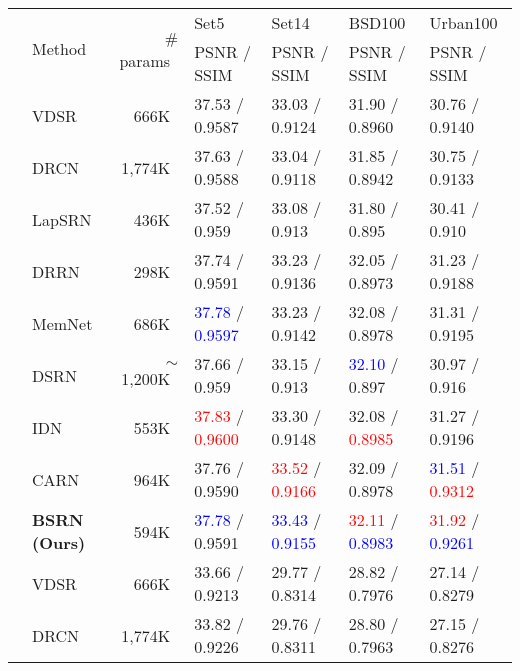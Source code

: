 \documentclass[runningheads]{llncs}
\begin{document}
\begin{table*}[t!]
	\scriptsize
	\begin{center}
		\begin{tabular}{c l r l l l l}
			\noalign{\smallskip}
			\hline
			\noalign{\smallskip}
			\multirow{2}{*}{~Scale~} & \multirow{2}{*}{Method} & \multirow{2}{*}{\# params~} & Set5 & Set14 & BSD100 & Urban100 \\
			& & & PSNR / SSIM~ & PSNR / SSIM~ & PSNR / SSIM~ & PSNR / SSIM~ \\
			\noalign{\smallskip}
			\hline
			\noalign{\smallskip}
			\multirow{9}{*}{$\times$2} & VDSR \cite{kim2016accurate} & 666K~ & 37.53 / 0.9587 & 33.03 / 0.9124 & 31.90 / 0.8960 & 30.76 / 0.9140 \\
			& DRCN \cite{kim2016deeply} & 1,774K~ & 37.63 / 0.9588 & 33.04 / 0.9118 & 31.85 / 0.8942 & 30.75 / 0.9133 \\
			& LapSRN \cite{lai2017deep} & 436K~ & 37.52 / 0.959~~ & 33.08 / 0.913~~ & 31.80 / 0.895~~ & 30.41 / 0.910~~ \\
			& DRRN \cite{tai2017image} & 298K~ & 37.74 / 0.9591 & 33.23 / 0.9136 & 32.05 / 0.8973 & 31.23 / 0.9188 \\
			& MemNet \cite{tai2017memnet} & 686K~ & \textcolor{blue}{37.78} / \textcolor{blue}{0.9597} & 33.23 / 0.9142 & 32.08 / 0.8978 & 31.31 / 0.9195 \\
			& DSRN \cite{han2018image} & $\sim$1,200K~ & 37.66 / 0.959~~ & 33.15 / 0.913~~ & \textcolor{blue}{32.10} / 0.897~~ & 30.97 / 0.916~~ \\
			& IDN \cite{hui2018fast} & 553K~ & \textcolor{red}{37.83} / \textcolor{red}{0.9600} & 33.30 / 0.9148 & 32.08 / \textcolor{red}{0.8985} & 31.27 / 0.9196 \\
			& CARN \cite{ahn2018fast} & 964K~ & 37.76 / 0.9590 & \textcolor{red}{33.52} / \textcolor{red}{0.9166} & 32.09 / 0.8978 & \textcolor{blue}{31.51} / \textcolor{red}{0.9312} \\
			& \textbf{BSRN (Ours)} & 594K~ & \textcolor{blue}{37.78} / 0.9591 & \textcolor{blue}{33.43} / \textcolor{blue}{0.9155} & \textcolor{red}{32.11} / \textcolor{blue}{0.8983} & \textcolor{red}{31.92} / \textcolor{blue}{0.9261} \\
			\noalign{\smallskip}
			\hline
			\noalign{\smallskip}
			\multirow{8}{*}{$\times$3} & VDSR \cite{kim2016accurate} & 666K~ & 33.66 / 0.9213 & 29.77 / 0.8314 & 28.82 / 0.7976 & 27.14 / 0.8279 \\
			& DRCN \cite{kim2016deeply} & 1,774K~ & 33.82 / 0.9226 & 29.76 / 0.8311 & 28.80 / 0.7963 & 27.15 / 0.8276 \\

\end{tabular}
\end{center}
\end{table*}
\end{document}

